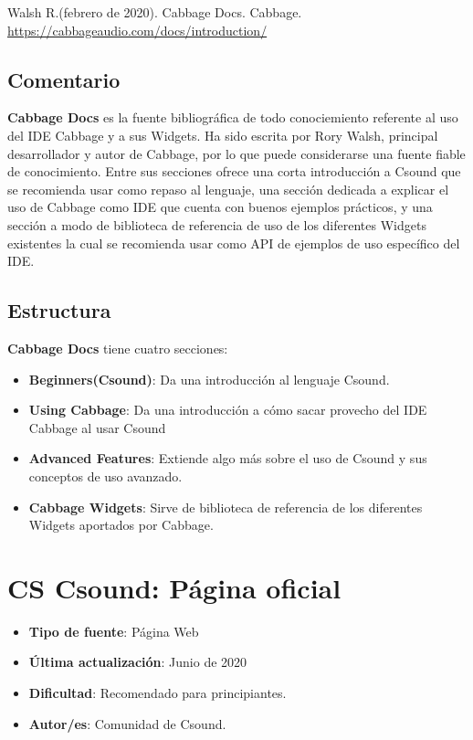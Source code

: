 Walsh R.(febrero de 2020). Cabbage Docs. Cabbage. \url{https://cabbageaudio.com/docs/introduction/}

\subsection{Comentario}

\textbf{Cabbage Docs} es la fuente bibliográfica de todo conociemiento referente al uso del IDE Cabbage y a sus Widgets. Ha sido escrita por Rory Walsh, principal desarrollador y autor de Cabbage, por lo que puede considerarse una fuente fiable de conocimiento.
Entre sus secciones ofrece una corta introducción a Csound que se recomienda usar como repaso al lenguaje, una sección dedicada a explicar el uso de Cabbage como IDE que cuenta con buenos ejemplos prácticos, y una sección a modo de biblioteca de referencia de uso de los diferentes Widgets existentes la cual se recomienda usar como API de ejemplos de uso específico del IDE.

\subsection{Estructura}

\textbf{Cabbage Docs} tiene cuatro secciones:
 \begin{itemize}
 \item \textbf{Beginners(Csound)}: Da una introducción al lenguaje Csound.
 
 \item \textbf{Using Cabbage}: Da una introducción a cómo sacar provecho del IDE Cabbage al usar Csound
 
 \item \textbf{Advanced Features}: Extiende algo más sobre el uso de Csound y sus conceptos de uso avanzado.
 
 \item \textbf{Cabbage Widgets}: Sirve de biblioteca de referencia de los diferentes Widgets aportados por Cabbage.
 \end{itemize} 
 
\section{CS Csound: Página oficial}

 \begin{itemize}
 \item \textbf{Tipo de fuente}: Página Web
 
 \item \textbf{Última actualización}: Junio de 2020
 
 \item \textbf{Dificultad}: Recomendado para principiantes.
 
 \item \textbf{Autor/es}: Comunidad de Csound.
 \end{itemize}

